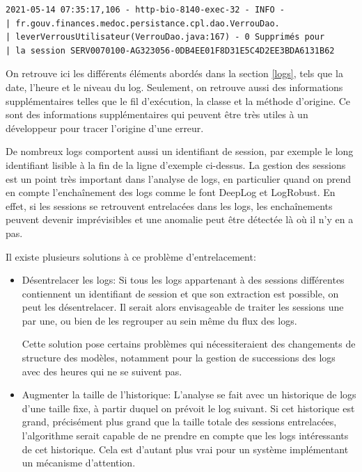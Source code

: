\documentclass[openany, 11pt]{memoir}
\begin{document}
\begin{lstlisting}
2021-05-14 07:35:17,106 - http-bio-8140-exec-32 - INFO -
| fr.gouv.finances.medoc.persistance.cpl.dao.VerrouDao.
| leverVerrousUtilisateur(VerrouDao.java:167) - 0 Supprimés pour
| la session SERV0070100-AG323056-0DB4EE01F8D31E5C4D2EE3BDA6131B62
\end{lstlisting}

On retrouve ici les différents éléments abordés dans la section \ref{logs}, tels que la date, l'heure et le niveau du \gls{log}. Seulement, on retrouve aussi des informations supplémentaires telles que le fil d'exécution, la classe et la méthode d'origine. Ce sont des informations supplémentaires qui peuvent être très utiles à un développeur pour tracer l'origine d'une erreur.

\bigskip
De nombreux \glspl{log} comportent aussi un identifiant de session, par exemple le long identifiant lisible à la fin de la ligne d'exemple ci-dessus. La gestion des sessions est un point très important dans l'analyse de logs, en particulier quand on prend en compte l'enchaînement des logs comme le font DeepLog et LogRobust. En effet, si les sessions se retrouvent entrelacées dans les logs, les enchaînements peuvent devenir imprévisibles et une anomalie peut être détectée là où il n'y en a pas.

Il existe plusieurs solutions à ce problème d'entrelacement:
\begin{itemize}
	\item Désentrelacer les \glspl{log}: Si tous les logs appartenant à des sessions différentes contiennent un identifiant de session et que son extraction est possible, on peut les désentrelacer. Il serait alors envisageable de traiter les sessions une par une, ou bien de les regrouper au sein même du flux des logs.

Cette solution pose certains problèmes qui nécessiteraient des changements de structure des modèles, notamment pour la gestion de successions des \glspl{log} avec des heures qui ne se suivent pas.

	\item Augmenter la taille de l'historique: L'analyse se fait avec un historique de \glspl{log} d'une taille fixe, à partir duquel on prévoit le log suivant. Si cet historique est grand, précisément plus grand que la taille totale des sessions entrelacées, l'algorithme serait capable de ne prendre en compte que les logs intéressants de cet historique. Cela est d'autant plus vrai pour un système implémentant un mécanisme d'attention.
\end{itemize}
\end{document}
